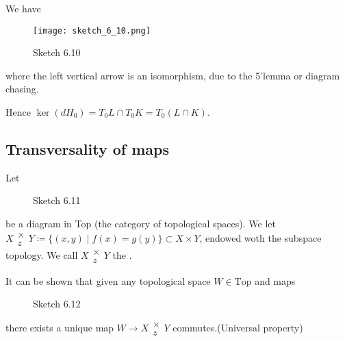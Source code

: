 \begin{remark}
    We have 
    \begin{figure}[H]
        \centering
        \texttt{[image: sketch\_6\_10.png]}
        \caption{Sketch 6.10}
    \end{figure}
    where the left vertical arrow is an isomorphism, due to the 5'lemma or diagram chasing.

    Hence \(\ker (dH_0)=T_0L\cap T_0K=T_0(L\cap K)\).
\end{remark}

\subsection{Transversality of maps}

\begin{definition*} %
    Let \begin{figure}[H]\label{fig:6.11}
        \centering
        \caption{Sketch 6.11}
    \end{figure}
    be a diagram in Top (the category of topological spaces). We let \(X\substack{\times\\z} Y \coloneqq \{(x,y)\mid f(x)=g(y)\}\subset X\times Y\),
    endowed woth the subspace topology. We call \(X\substack{\times\\z} Y\) the .
\end{definition*}

\begin{remark}
It can be shown that given any topological space \(W\in \text{Top}\) and maps 
\begin{center}
\end{center}
\begin{figure}[H]\label{fig:6.12}
    \centering
    
    \caption{Sketch 6.12}
\end{figure}

there exists a unique map \(W\to X\substack{\times\\ z} Y\) commutes.(Universal property)
\end{remark}

